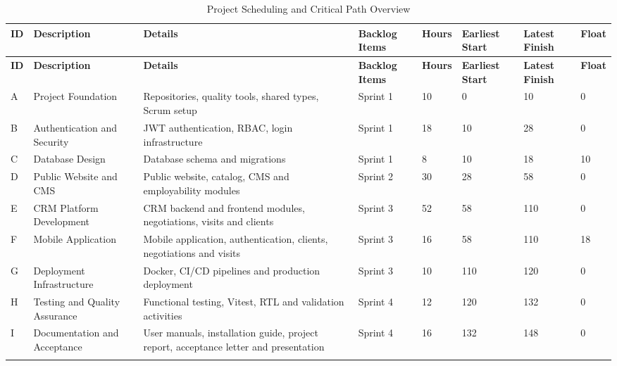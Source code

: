\documentclass[letterpaper%
, oneside%
, 12pt%
, memoireprojet%
, english%
,creativecommons,hyperref, withAlgo2e %
]{thETS}
\begin{document}
\begingroup
\setlength{\LTleft}{-1.2cm plus -1fill}
\setlength{\LTright}{\LTleft}
\setlength{\LTcapwidth}{\textwidth}
\begin{longtable}{|p{1cm}|p{3.0cm}|p{3.0cm}|p{3.0cm}|p{0.9cm}|p{1.0cm}|p{1.0cm}|p{1.0cm}|}
\hline
\textbf{ID} & \textbf{Description} & \textbf{Details} & \textbf{Backlog Items} & \textbf{Hours} & \textbf{Earliest Start} & \textbf{Latest Finish} & \textbf{Float} \\ \hline
\endfirsthead
\hline
\textbf{ID} & \textbf{Description} & \textbf{Details} & \textbf{Backlog Items} & \textbf{Hours} & \textbf{Earliest Start} & \textbf{Latest Finish} & \textbf{Float} \\ \hline
\endhead
A & Project Foundation & Repositories, quality tools, shared types, Scrum setup & Sprint 1 & 10 & 0 & 10 & 0 \\ \hline

B & Authentication and Security & JWT authentication, RBAC, login infrastructure & Sprint 1 & 18 & 10 & 28 & 0 \\ \hline

C & Database Design & Database schema and migrations & Sprint 1 & 8 & 10 & 18 & 10 \\ \hline

D & Public Website and CMS & Public website, catalog, CMS and employability modules & Sprint 2 & 30 & 28 & 58 & 0 \\ \hline

E & CRM Platform Development & CRM backend and frontend modules, negotiations, visits and clients & Sprint 3 & 52 & 58 & 110 & 0 \\ \hline

F & Mobile Application & Mobile application, authentication, clients, negotiations and visits & Sprint 3 & 16 & 58 & 110 & 18 \\ \hline

G & Deployment Infrastructure & Docker, CI/CD pipelines and production deployment & Sprint 3 & 10 & 110 & 120 & 0 \\ \hline

H & Testing and Quality Assurance & Functional testing, Vitest, RTL and validation activities & Sprint 4 & 12 & 120 & 132 & 0 \\ \hline

I & Documentation and Acceptance & User manuals, installation guide, project report, acceptance letter and presentation & Sprint 4 & 16 & 132 & 148 & 0 \\ \hline
\caption{Project Scheduling and Critical Path Overview}
\label{tab:project_scheduling}
\end{longtable}
\endgroup
\end{document}

